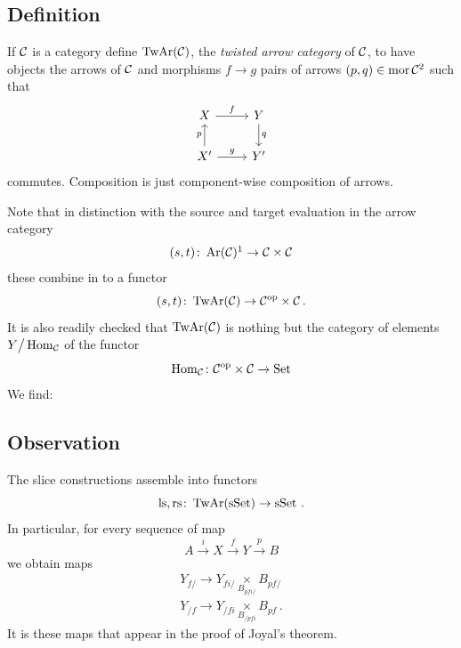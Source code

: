     \subsection{Definition}\label{chVI-3-31}
        If $\mathcal{C}$ is a category define $\operatorname{TwAr}(\mathcal{C})$, the \emph{twisted arrow category} of $\mathcal{C}$, to have objects the arrows of $\mathcal{C}$ and morphisms $f \to g$ pairs of arrows $(p, q) \in \operatorname{mor} \mathcal{C}^2$ such that
        \begin{equation*}
            \begin{tikzcd}
                X \arrow[r, "f"] & Y \arrow[d, "q"] \\
                X' \arrow[u, "p"] \arrow[r, "g"] & Y'
            \end{tikzcd}	
        \end{equation*}
        commutes. Composition is just component-wise composition of arrows.
        \medskip

        Note that in distinction with the source and target evaluation in the arrow category
        \begin{equation*}
            (s, t) \colon \Ar (\Cc)\footnotemark \to \Cc \times \Cc
        \end{equation*}
        these combine in to a functor
        \begin{equation*}
            (s, t) \colon \operatorname{TwAr} (\mathcal{C}) \to \mathcal{C}^{\operatorname{op}} \times \mathcal{C} \,.
        \end{equation*}	
        It is also readily checked that $\operatorname{TwAr}(\mathcal{C})$ is nothing but the category of elements $Y \big/ \operatorname{Hom}_{\mathcal{C}}$ of the functor
        \begin{equation*}
            \operatorname{Hom}_{\mathcal{C}} \colon \mathcal{C}^{\operatorname{op}} \times \mathcal{C} \to \operatorname{Set}
        \end{equation*}
        We find:

    \subsection{Observation}\label{chVI-3-40}
        The slice constructions assemble into functors
        \begin{equation*}
            \operatorname{ls}, \operatorname{rs} \colon \operatorname{TwAr}(\operatorname{sSet}) \to \operatorname{sSet} \,.
        \end{equation*}
        In particular, for every sequence of map
        \begin{equation*}
            A \xrightarrow{i} X \xrightarrow{f} Y \xrightarrow{p} B
        \end{equation*}	
        we obtain maps
        \begin{align*}
            Y_{f /} \to Y_{f i /} \underset{B_{p f i /}}{\times} B_{p f /} \\
            Y_{/ f} \to Y_{/ f i} \underset{B_{/ p f i}}{\times} B_{p f} \,.
        \end{align*}
        It is these maps that appear in the proof of Joyal's theorem.
        \smallskip

